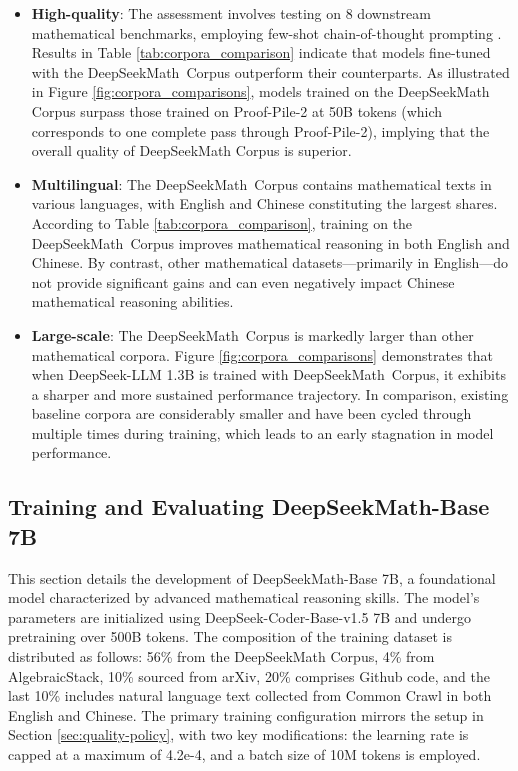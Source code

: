 \begin{itemize}[topsep=0pt]
    \item \textbf{High-quality}:
    The assessment involves testing on 8 downstream mathematical benchmarks, employing few-shot chain-of-thought prompting \cite{cot}. Results in Table \ref{tab:corpora_comparison} indicate that models fine-tuned with the DeepSeekMath~Corpus outperform their counterparts. As illustrated in Figure \ref{fig:corpora_comparisons}, models trained on the DeepSeekMath Corpus surpass those trained on Proof-Pile-2 at 50B tokens (which corresponds to one complete pass through Proof-Pile-2), implying that the overall quality of DeepSeekMath Corpus is superior.
    \item \textbf{Multilingual}:
    The DeepSeekMath~Corpus contains mathematical texts in various languages, with English and Chinese constituting the largest shares. According to Table \ref{tab:corpora_comparison}, training on the DeepSeekMath~Corpus improves mathematical reasoning in both English and Chinese. By contrast, other mathematical datasets—primarily in English—do not provide significant gains and can even negatively impact Chinese mathematical reasoning abilities.
    \item \textbf{Large-scale}:
    The DeepSeekMath~Corpus is markedly larger than other mathematical corpora. Figure \ref{fig:corpora_comparisons} demonstrates that when DeepSeek-LLM 1.3B is trained with DeepSeekMath~Corpus, it exhibits a sharper and more sustained performance trajectory. In comparison, existing baseline corpora are considerably smaller and have been cycled through multiple times during training, which leads to an early stagnation in model performance.
\end{itemize}

\subsection{Training and Evaluating DeepSeekMath-Base 7B}

This section details the development of DeepSeekMath-Base 7B, a foundational model characterized by advanced mathematical reasoning skills. The model’s parameters are initialized using DeepSeek-Coder-Base-v1.5 7B \citep{deepseek-coder} and undergo pretraining over 500B tokens. The composition of the training dataset is distributed as follows: 56\% from the DeepSeekMath Corpus, 4\% from AlgebraicStack, 10\% sourced from arXiv, 20\% comprises Github code, and the last 10\% includes natural language text collected from Common Crawl in both English and Chinese. The primary training configuration mirrors the setup in Section \ref{sec:quality-policy}, with two key modifications: the learning rate is capped at a maximum of 4.2e-4, and a batch size of 10M tokens is employed.

